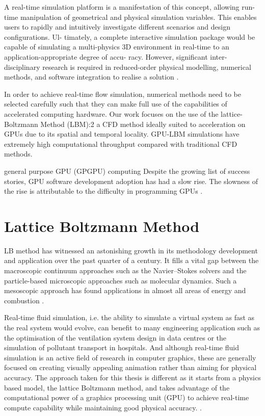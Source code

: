 A real-time simulation platform is a manifestation of this concept, allowing run-time manipulation of geometrical and physical simulation variables. This enables users to rapidly and intuitively investigate different scenarios and design configurations. Ul- timately, a complete interactive simulation package would be capable of simulating a multi-physics 3D environment in real-time to an application-appropriate degree of accu- racy. However, significant inter-disciplinary research is required in reduced-order physical modelling, numerical methods, and software integration to realise a solution \citep{harwoodREALTIMEMODELLINGSIMULATION}.

In order to achieve real-time flow simulation, numerical methods need to be selected carefully such that they can make full use of the capabilities of accelerated computing hardware. Our work focuses on the use of the lattice-Boltzmann Method (LBM):2 a CFD method ideally suited to acceleration on GPUs due to its spatial and temporal locality. GPU-LBM simulations have extremely high computational throughput compared with traditional CFD methods.

general purpose GPU (GPGPU) computing
Despite the growing list of success stories, GPU software development adoption has had a slow rise. The slowness of the rise is attributable to the difficulty in programming GPUs \citep{malcolmArrayFireGPUAcceleration2012}.

\section{Lattice Boltzmann Method}

LB method has witnessed an astonishing growth in its methodology development and application over the past quarter of a century. It fills a vital gap between the macroscopic continuum approaches such as the Navier–Stokes solvers and the particle-based microscopic approaches such as molecular dynamics. Such a mesoscopic approach has found applications in almost all areas of energy and combustion \cite{liLatticeBoltzmannMethods2016a}.

Real-time fluid simulation, i.e. the ability to simulate a virtual system as fast as the real system would evolve, can benefit to many engineering application such as the optimisation of the ventilation system design in data centres or the simulation of pollutant transport in hospitals. And although real-time fluid simulation is an active field of research in computer graphics, these are generally focused on creating visually appealing animation rather than aiming for physical accuracy. The approach taken for this thesis is different as it starts from a physics based model, the lattice Boltzmann method, and takes advantage of the computational power of a graphics processing unit (GPU) to achieve real-time compute capability while maintaining good physical accuracy. \cite{delboscRealTimeSimulationIndoor}.

